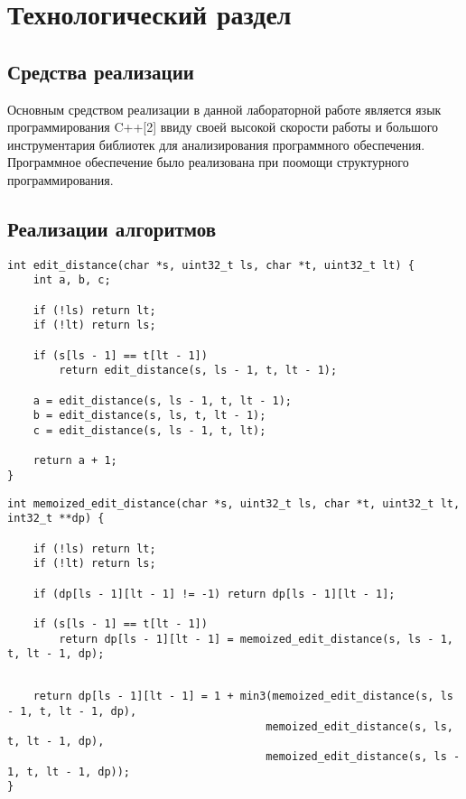 \chapter{Технологический раздел}
\label{cha:impl}


\section{Средства реализации}
Основным средством реализации в данной лабораторной работе является язык программирования C++[2] ввиду своей высокой скорости работы и большого инструментария библиотек для анализирования программного обеспечения. Программное обеспечение было реализована при поомощи структурного программирования.

\section{Реализации алгоритмов}

\begin{lstlisting}[caption=итеративный Алгоритм Левенштейна]
int edit_distance(char *s, uint32_t ls, char *t, uint32_t lt) {
    int a, b, c;

    if (!ls) return lt;
    if (!lt) return ls;

    if (s[ls - 1] == t[lt - 1])
        return edit_distance(s, ls - 1, t, lt - 1);

    a = edit_distance(s, ls - 1, t, lt - 1);
    b = edit_distance(s, ls, t, lt - 1);
    c = edit_distance(s, ls - 1, t, lt);

    return a + 1;
}

\end{lstlisting}


\begin{lstlisting}[caption=Алгоритм Левенштейна с мемоизацией]
int memoized_edit_distance(char *s, uint32_t ls, char *t, uint32_t lt, int32_t **dp) {

    if (!ls) return lt;
    if (!lt) return ls;

    if (dp[ls - 1][lt - 1] != -1) return dp[ls - 1][lt - 1];

    if (s[ls - 1] == t[lt - 1])
        return dp[ls - 1][lt - 1] = memoized_edit_distance(s, ls - 1, t, lt - 1, dp);
\end{lstlisting}
\begin{lstlisting}[caption=Алгоритм Левенштейна с мемоизацией]

    return dp[ls - 1][lt - 1] = 1 + min3(memoized_edit_distance(s, ls - 1, t, lt - 1, dp),
                                        memoized_edit_distance(s, ls, t, lt - 1, dp),
                                        memoized_edit_distance(s, ls - 1, t, lt - 1, dp));
}
\end{lstlisting}

